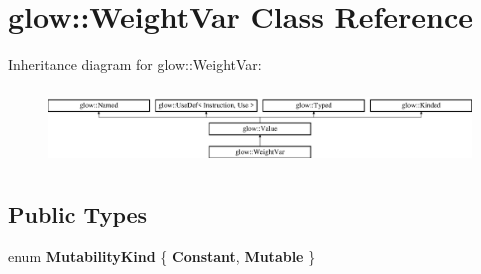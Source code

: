 \hypertarget{classglow_1_1_weight_var}{}\section{glow\+:\+:Weight\+Var Class Reference}
\label{classglow_1_1_weight_var}
Inheritance diagram for glow\+:\+:Weight\+Var\+:\begin{figure}[H]
\begin{center}
\leavevmode
\includegraphics[height=2.048780cm]{classglow_1_1_weight_var}
\end{center}
\end{figure}
\subsection*{Public Types}
\begin{DoxyCompactItemize}
\item 
\mbox{\label{classglow_1_1_weight_var_a170464b9d454b830266214b318d3bace}} 
enum {\bfseries Mutability\+Kind} \{ {\bfseries Constant}, 
{\bfseries Mutable}
 \}
\end{DoxyCompactItemize}
